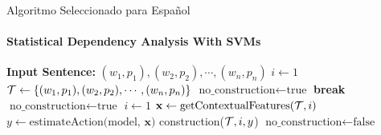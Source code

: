 \documentclass{beamer}
\begin{document}
\begin{frame}[label=alg]{Algoritmo Seleccionado para Español}
  \framesubtitle{Statistical Dependency Analysis With SVMs}
  \footnotesize
  \begin{algorithmic}[1] %
    \State \textbf{Input Sentence:} $(w_1, p_1),(w_2,p_2),\cdots,(w_n,p_n)$
    \Init
       \State $i\gets 1$
       \State ${\cal T}\gets \{(w_1, p_1),(w_2,p_2),\cdots,(w_n,p_n)\}$
       \State $\text{no\_construction}\gets \text{true}$
    \EndInit
                \textbf{break}
             \EndIf
             \State $\text{no\_construction}\gets \text{true}$
             \State $i\gets 1$
          \Else
             \State $\mathbf{x}\gets \text{getContextualFeatures(${\cal T}, i$)} $
             \State $y\gets \text{estimateAction(model, $\mathbf{x}$)}$
             \State construction(${\cal T}, i, y$)
                $\text{no\_construction}\gets \text{false}$
             \EndIf
          \EndIf
       \EndWhile
  \end{algorithmic}
\end{frame}
\end{document}
